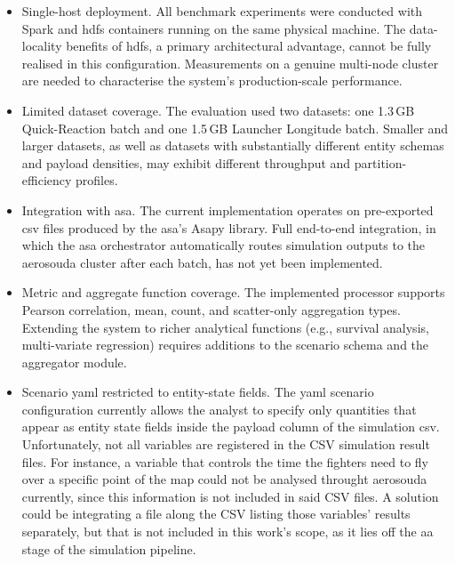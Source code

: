 \begin{itemize}
    \item Single-host deployment.  All benchmark experiments were conducted with
          Spark and \gls{hdfs} containers running on the same physical machine.  The
          data-locality benefits of \gls{hdfs}, a primary architectural advantage, cannot
          be fully realised in this configuration.  Measurements on a genuine multi-node
          cluster are needed to characterise the system's production-scale performance.

    \item Limited dataset coverage.  The evaluation used two datasets: one
          1.3\,GB Quick-Reaction batch and one 1.5\,GB Launcher Longitude batch.  Smaller
          and larger datasets, as well as datasets with substantially different entity
          schemas and payload densities, may exhibit different throughput and
          partition-efficiency profiles.

    \item Integration with \gls{asa}.  The current implementation operates on
          pre-exported \gls{csv} files produced by the \gls{asa}'s Asapy library.  Full end-to-end
          integration, in which the \gls{asa} orchestrator automatically routes simulation
          outputs to the \gls{aerosouda} cluster after each batch, has not yet been
          implemented.

    \item Metric and aggregate function coverage.  The implemented processor
          supports Pearson correlation, mean, count, and scatter-only aggregation types.
          Extending the system to richer analytical functions (e.g., survival analysis,
          multi-variate regression) requires additions to the scenario schema and the
          aggregator module.

    \item Scenario \gls{yaml} restricted to entity-state fields.
          The \gls{yaml} scenario configuration currently allows the analyst to specify
          only quantities that appear as entity state fields inside the payload column of
          the simulation \gls{csv}.  Unfortunately, not all variables are registered in
          the CSV simulation result files. For instance, a variable that controls the time
          the fighters need to fly over a specific point of the map could not be analysed
          throught \gls{aerosouda} currently, since this information is not included in
          said CSV files.  A solution could be integrating a file along the CSV listing
          those variables' results separately, but that is not included in this work's
          scope, as it lies off the \gls{aa} stage of the simulation pipeline.
\end{itemize}

